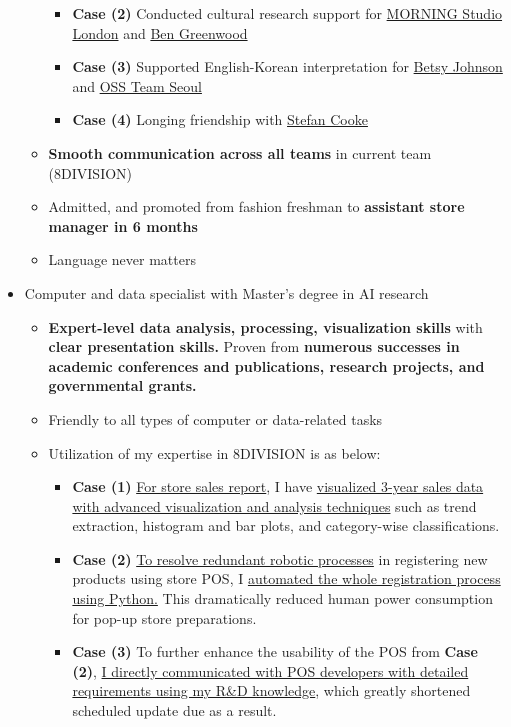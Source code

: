 \documentclass[a4paper,10pt]{extarticle}
\begin{document}
\begin{itemize}
\begin{itemize}
\begin{itemize}
			            \item \textbf{Case (2)} Conducted cultural research support for \href{https://www.instagram.com/morning.fyi/}{MORNING Studio London} and \href{https://www.instagram.com/bengreenie15}{Ben Greenwood}
			            \item \textbf{Case (3)} Supported English-Korean interpretation for \href{https://www.instagram.com/betsyjohnson_/}{Betsy Johnson} and \href{https://www.instagram.com/ourspecialsupport/}{OSS Team Seoul}
			            \item \textbf{Case (4)} Longing friendship with \href{https://www.instagram.com/stefan_cooke/}{Stefan Cooke}
		            \end{itemize}
		      \item \textbf{Smooth communication across all teams} in current team (8DIVISION)
		      \item Admitted, and promoted from fashion freshman to \textbf{assistant store manager in 6 months}
		      \item Language never matters
	      \end{itemize}
	\item Computer and data specialist with Master's degree in AI research
	      \begin{itemize}
		      \item \textbf{Expert-level data analysis, processing, visualization skills} with \textbf{clear presentation skills.} Proven from \textbf{numerous successes in academic conferences and publications, research projects, and governmental grants.}
		      \item Friendly to all types of computer or data-related tasks
		      \item Utilization of my expertise in 8DIVISION is as below:
		            \begin{itemize}
			            \item \textbf{Case (1)} \ul{For store sales report}, I have \ul{visualized 3-year sales data with advanced visualization and analysis techniques} such as trend extraction, histogram and bar plots, and category-wise classifications.
			            \item \textbf{Case (2)} \ul{To resolve redundant robotic processes} in registering new products using store POS, I \ul{automated the whole registration process using Python.} This dramatically reduced human power consumption for pop-up store preparations.
			            \item \textbf{Case (3)} To further enhance the usability of the POS from \textbf{Case (2)}, \ul{I directly communicated with POS developers with detailed requirements using my R\&D knowledge}, which greatly shortened scheduled update due as a result.

\end{itemize}
\end{itemize}
\end{itemize}
\end{document}

